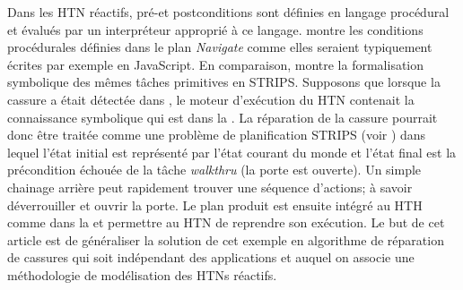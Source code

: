 \documentclass[a4paper,twoside,french]{article}
\begin{document}

	
		\par Dans les HTN réactifs, pré-et postconditions sont définies en langage  procédural et évalués par un interpréteur approprié à ce langage.   montre les  conditions procédurales définies dans le plan {\em Navigate} comme elles seraient typiquement écrites par exemple en JavaScript. 
		 En comparaison,  montre la formalisation symbolique  des mêmes tâches primitives en STRIPS. 
		Supposons que lorsque la cassure a était détectée dans , le moteur d'exécution du HTN  contenait la connaissance symbolique qui est dans la  . La réparation de la cassure pourrait donc être traitée comme une problème de planification STRIPS (voir ) dans lequel l'état initial est représenté par l'état courant du monde et l'état final est la précondition échouée de la tâche {\em walkthru} (la porte est ouverte). Un simple chainage arrière peut rapidement trouver une séquence d'actions; à savoir déverrouiller et ouvrir la porte. Le plan produit est ensuite intégré au HTH  comme dans la  et permettre au HTN de reprendre son exécution.  Le but de cet article est de généraliser la solution de cet exemple en algorithme de réparation de cassures qui soit indépendant des applications et auquel on associe une méthodologie de modélisation des HTNs réactifs.
		
\end{document}
